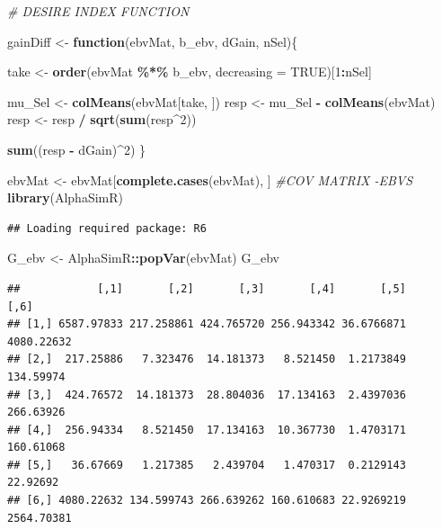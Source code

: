 \documentclass[
  12pt,
]{article}
\newenvironment{Shaded}{\begin{snugshade}}{\end{snugshade}}
\newcommand{\AttributeTok}[1]{\textcolor[rgb]{0.13,0.29,0.53}{#1}}
\newcommand{\CommentTok}[1]{\textcolor[rgb]{0.56,0.35,0.01}{\textit{#1}}}
\newcommand{\ConstantTok}[1]{\textcolor[rgb]{0.56,0.35,0.01}{#1}}
\newcommand{\ControlFlowTok}[1]{\textcolor[rgb]{0.13,0.29,0.53}{\textbf{#1}}}
\newcommand{\DecValTok}[1]{\textcolor[rgb]{0.00,0.00,0.81}{#1}}
\newcommand{\FunctionTok}[1]{\textcolor[rgb]{0.13,0.29,0.53}{\textbf{#1}}}
\newcommand{\NormalTok}[1]{#1}
\newcommand{\OtherTok}[1]{\textcolor[rgb]{0.56,0.35,0.01}{#1}}
\newcommand{\SpecialCharTok}[1]{\textcolor[rgb]{0.81,0.36,0.00}{\textbf{#1}}}
\begin{document}
\begin{Shaded}
\begin{Highlighting}[]
\CommentTok{\# DESIRE INDEX FUNCTION}

\NormalTok{gainDiff }\OtherTok{\textless{}{-}} \ControlFlowTok{function}\NormalTok{(ebvMat, b\_ebv, dGain, nSel)\{ }
  
\NormalTok{  take }\OtherTok{\textless{}{-}} \FunctionTok{order}\NormalTok{(ebvMat }\SpecialCharTok{\%*\%}\NormalTok{ b\_ebv, }\AttributeTok{decreasing =} \ConstantTok{TRUE}\NormalTok{)[}\DecValTok{1}\SpecialCharTok{:}\NormalTok{nSel]}
  
\NormalTok{  mu\_Sel }\OtherTok{\textless{}{-}} \FunctionTok{colMeans}\NormalTok{(ebvMat[take, ])}
\NormalTok{  resp   }\OtherTok{\textless{}{-}}\NormalTok{ mu\_Sel }\SpecialCharTok{{-}} \FunctionTok{colMeans}\NormalTok{(ebvMat)}
\NormalTok{  resp   }\OtherTok{\textless{}{-}}\NormalTok{ resp }\SpecialCharTok{/} \FunctionTok{sqrt}\NormalTok{(}\FunctionTok{sum}\NormalTok{(resp}\SpecialCharTok{\^{}}\DecValTok{2}\NormalTok{))}
  
  \FunctionTok{sum}\NormalTok{((resp }\SpecialCharTok{{-}}\NormalTok{ dGain)}\SpecialCharTok{\^{}}\DecValTok{2}\NormalTok{)}
\NormalTok{\}}
\end{Highlighting}
\end{Shaded}

\begin{Shaded}
\begin{Highlighting}[]
\NormalTok{ebvMat }\OtherTok{\textless{}{-}}\NormalTok{ ebvMat[}\FunctionTok{complete.cases}\NormalTok{(ebvMat), ]}
\CommentTok{\#COV MATRIX {-}EBVS}
\FunctionTok{library}\NormalTok{(AlphaSimR)}
\end{Highlighting}
\end{Shaded}

\begin{verbatim}
## Loading required package: R6
\end{verbatim}

\begin{Shaded}
\begin{Highlighting}[]
\NormalTok{G\_ebv }\OtherTok{\textless{}{-}}\NormalTok{ AlphaSimR}\SpecialCharTok{::}\FunctionTok{popVar}\NormalTok{(ebvMat)}
\NormalTok{G\_ebv}
\end{Highlighting}
\end{Shaded}

\begin{verbatim}
##            [,1]       [,2]       [,3]       [,4]       [,5]       [,6]
## [1,] 6587.97833 217.258861 424.765720 256.943342 36.6766871 4080.22632
## [2,]  217.25886   7.323476  14.181373   8.521450  1.2173849  134.59974
## [3,]  424.76572  14.181373  28.804036  17.134163  2.4397036  266.63926
## [4,]  256.94334   8.521450  17.134163  10.367730  1.4703171  160.61068
## [5,]   36.67669   1.217385   2.439704   1.470317  0.2129143   22.92692
## [6,] 4080.22632 134.599743 266.639262 160.610683 22.9269219 2564.70381
\end{verbatim}
\end{document}
